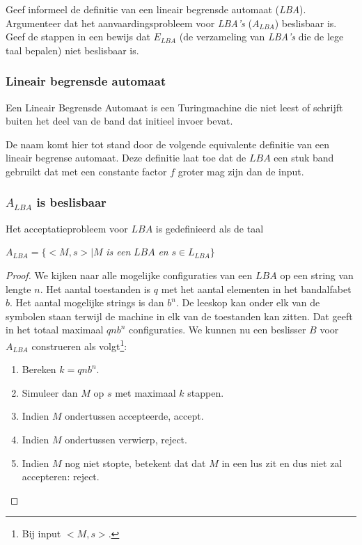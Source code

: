 \begin{question}
	Geef informeel de definitie van een lineair begrensde automaat (\emph{LBA}). Argumenteer dat het aanvaardingsprobleem voor \emph{LBA's} ($A_{LBA}$) beslisbaar is. Geef de stappen in een bewijs dat $E_{LBA}$ (de verzameling van \emph{LBA's} die de lege taal bepalen) niet beslisbaar is.
\end{question}

\subsubsection*{Lineair begrensde automaat}

\begin{theorem}
	Een Lineair Begrensde Automaat is een Turingmachine die niet leest of schrijft buiten het deel van de band dat initieel invoer bevat.
\end{theorem}

De naam komt hier tot stand door de volgende equivalente definitie van een lineair begrense automaat. Deze definitie laat toe dat de $LBA$ een stuk band gebruikt dat met een constante factor $f$ groter mag zijn dan de input.

\subsubsection*{$A_{LBA}$ is beslisbaar}

Het acceptatieprobleem voor $LBA$ is gedefinieerd als de taal
\begin{center}
	$A_{LBA} = \{<M,s>|M$ \textit{is een} $LBA$ \textit{en} $s \in L_{LBA}\}$
\end{center}

\begin{proof}
	We kijken naar alle mogelijke configuraties van een $LBA$ op een string van lengte $n$. Het aantal toestanden is $q$ met het aantal elementen in het bandalfabet $b$. Het aantal mogelijke strings is dan $b^n$. De leeskop kan onder elk van de symbolen staan terwijl de machine in elk van de toestanden kan zitten. Dat geeft in het totaal maximaal $qnb^n$ configuraties.
	We kunnen nu een beslisser $B$ voor $A_{LBA}$ construeren als volgt\footnote{Bij input $<M,s>$.}:
	\begin{enumerate}
		\item Bereken $k=qnb^n$.
		\item Simuleer dan $M$ op $s$ met maximaal $k$ stappen.
		\item Indien $M$ ondertussen accepteerde, accept.
		\item Indien $M$ ondertussen verwierp, reject.
		\item Indien $M$ nog niet stopte, betekent dat dat $M$ in een lus zit en dus niet zal accepteren: reject.
	\end{enumerate}
\end{proof}

